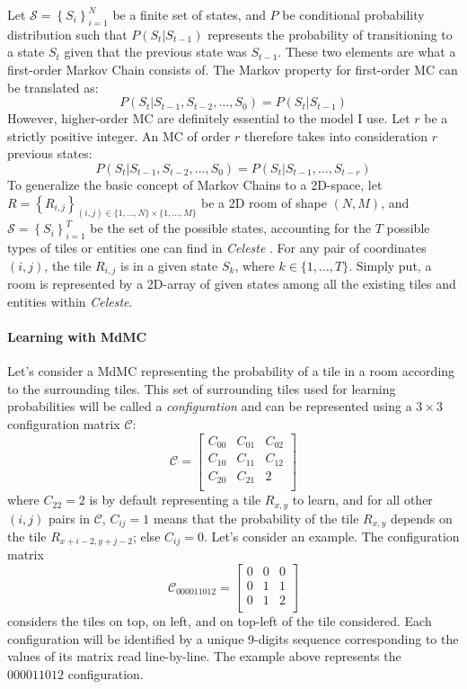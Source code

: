 \documentclass{article}
\newcommand{\Celeste}{\textit{Celeste} }
\newcommand{\Celnosp}{\textit{Celeste}}
\begin{document}
\noindent Let $\mathcal{S} = \left\{S_i\right\}_{i=1}^N$ be a finite set of states, and $P$ be conditional probability distribution such that $P(S_t|S_{t-1})$ represents the probability of transitioning to a state $S_t$ given that the previous state was $S_{t-1}$. These two elements are what a first-order Markov Chain consists of. The Markov property for first-order MC can be translated as: $$P(S_t|S_{t-1},S_{t-2},\ldots,S_{0}) = P(S_t|S_{t-1})$$
However, higher-order MC are definitely essential to the model I use. Let $r$ be a strictly positive integer. An MC of order $r$ therefore takes into consideration $r$ previous states: $$P(S_t|S_{t-1},S_{t-2},\ldots,S_{0}) = P(S_t|S_{t-1},\ldots,S_{t-r})$$
To generalize the basic concept of Markov Chains to a 2D-space, let $R = \left\{R_{i,j}\right\}_{(i,j) \in \{1,\ldots,N\}\times\{1,\ldots,M\}}$ be a 2D room of shape $(N,M)$, and $\mathcal{S} = \left\{S_i\right\}_{i=1}^T$ be the set of the possible states, accounting for the $T$ possible types of tiles or entities one can find in \Celeste. For any pair of coordinates $(i,j)$, the tile $R_{i,j}$ is in a given state $S_k$, where $k \in \{1,\ldots,T\}$. Simply put, a room is represented by a 2D-array of given states among all the existing tiles and entities within \Celnosp.

\paragraph{Learning with MdMC} Let's consider a MdMC representing the probability of a tile in a room according to the surrounding tiles. This set of surrounding tiles used for learning probabilities will be called a \textit{configuration} and can be represented using a $3\times3$ configuration matrix $\mathcal{C}$: $$\mathcal{C} =
\begin{bmatrix}
    C_{00} & C_{01} & C_{02}\\
    C_{10} & C_{11} & C_{12}\\
    C_{20} & C_{21} & 2\\
\end{bmatrix}$$
where $C_{22} = 2$ is by default representing a tile $R_{x,y}$ to learn, and for all other $(i,j)$ pairs in $\mathcal{C}$, $C_{ij} = 1$ means that the probability of the tile $R_{x,y}$ depends on the tile $R_{x+i-2,y+j-2}$; else $C_{ij} = 0$. Let's consider an example. The configuration matrix
$$\mathcal{C}_{000011012} =
\begin{bmatrix}
    0 & 0 & 0\\
    0 & 1 & 1\\
    0 & 1 & 2\\
\end{bmatrix}
$$
considers the tiles on top, on left, and on top-left of the tile considered. Each configuration will be identified by a unique 9-digits sequence corresponding to the values of its matrix read line-by-line. The example above represents the $000011012$ configuration.
\end{document}
